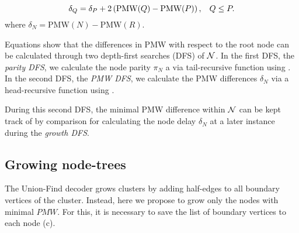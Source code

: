 \begin{equation}\label{eq:pseudodelay}
    {\delta}_Q = {\delta}_P + 2\left(\text{PMW}(Q) - \text{PMW}(P)\right), \hspace{.3cm} Q\leq P.
\end{equation}
where ${\delta}_N = \text{PMW}(N) - \text{PMW}(R)$. 


Equations  show that the differences in PMW with respect to the root node can be calculated through two depth-first searches (DFS) of $\mathcal{N}$. In the first DFS, the \emph{parity DFS}, we calculate the node parity $\pi_N$ a via tail-recursive function using . In the second DFS, the \emph{PMW DFS}, we calculate the PMW differences $\delta_N$ via a head-recursive function using . 

During this second DFS, the minimal PMW difference within $\mathcal{N}$ can be kept track of by comparison for calculating the node delay $\delta_N$ at a later instance during the \emph{growth DFS}. 

\subsection{Growing node-trees}\label{sec:grownodetrees}
The Union-Find decoder grows clusters by adding half-edges to all boundary vertices of the cluster. Instead, here we propose to grow only the nodes with minimal $PMW$. 
For this, it is necessary to save the list of boundary vertices to each node (c). %


